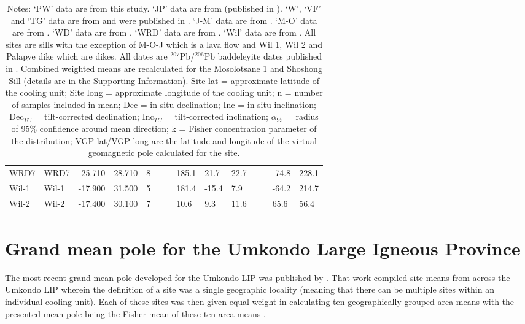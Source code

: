 \documentclass[11pt,letterpaper]{article}
\begin{document}
\begin{table}[!ht]
\begin{adjustwidth}{-0.0in}{0in}
\begin{tiny}
\begin{tabular}{p{2.0 cm}p{1.25 cm}llllllllllll}
WRD7                     &                                 WRD7 &   -25.710 &     28.710 &    8 &     &    &   185.1 &    21.7 &  22.7 &     &      &     -74.8 &      228.1 \\
Wil-1                    &                                Wil-1 &   -17.900 &     31.500 &    5 &     &    &   181.4 &   -15.4 &   7.9 &     &      &     -64.2 &      214.7 \\
Wil-2                    &                                Wil-2 &   -17.400 &     30.100 &    7 &     &    &    10.6 &     9.3 &  11.6 &     &      &      65.6 &       56.4 \\
\hline
\end{tabular}
\caption*{\footnotesize{Notes: `PW' data are from this study. `JP' data are from \cite{Pancake2001a} (published in \citealt{Gose2006a}). `W', `VF' and `TG' data are from \cite{Seidel2004a} and were published in \cite{Gose2006a}. `J-M' data are from \cite{Jones1966a}. `M-O' data are from \cite{McElhinny1964b}. `WD' data are from \cite{Gose2006a}. `WRD' data are from \cite{Mare2006a}. `Wil' data are from \cite{Wilson1987a}. All sites are sills with the exception of M-O-J which is a lava flow and Wil 1, Wil 2 and Palapye dike which are dikes. All dates are $^{207}$Pb/$^{206}$Pb baddeleyite dates published in \cite{Hanson2004a}. Combined weighted means are recalculated for the Mosolotsane 1 and Shoshong Sill (details are in the Supporting Information). Site lat = approximate latitude of the cooling unit; Site long =  approximate longitude of the cooling unit; n = number of samples included in mean; Dec = in situ declination; Inc = in situ inclination; Dec$_{TC}$ = tilt-corrected declination; Inc$_{TC}$ = tilt-corrected inclination; $\alpha_{95}$ = radius of 95$\%$ confidence around mean direction; k = Fisher concentration parameter of the distribution; VGP lat/VGP long are the latitude and longitude of the virtual geomagnetic pole calculated for the site.}}
\end{tiny}
\end{adjustwidth}
\end{table}


\section*{Grand mean pole for the Umkondo Large Igneous Province}

The most recent grand mean pole developed for the Umkondo LIP was published by \cite{Gose2006a}. That work compiled site means from across the Umkondo LIP wherein the definition of a site was a single geographic locality (meaning that there can be multiple sites within an individual cooling unit). Each of these sites was then given equal weight in calculating ten geographically grouped area means with the presented mean pole being the Fisher mean of these ten area means \citep{Gose2006a}.
\end{document}
